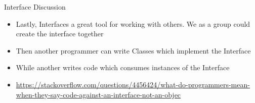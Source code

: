 \begin{frame}{Interface Discussion}
\begin{itemize}
\pause \item Lastly, Interfaces a great tool for working with others. We as a group could create the interface together
\pause \item Then another programmer can write Classes which implement the Interface
\pause \item While another writes code which consumes instances of the Interface 
\pause \item \url{https://stackoverflow.com/questions/4456424/what-do-programmers-mean-when-they-say-code-against-an-interface-not-an-objec} 
\end{itemize}
\end{frame}